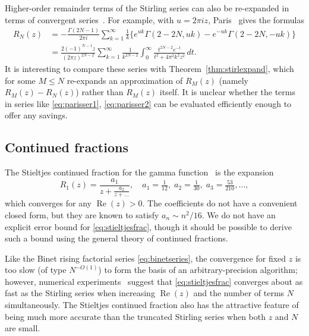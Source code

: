 \documentclass[reqno]{amsart}
\newcommand{\Real}{\operatorname{Re}}
\theoremstyle{definition}
\begin{document}
Higher-order remainder terms of the Stirling series can also
be re-expanded in terms of convergent series~\cite{Paris1992,paris2014comments,Nemes2015}.
For example, with $u = 2\pi i z$, Paris~\cite{paris2014comments} gives the formulas
\begin{align}
R_N(z) & =-\frac{\Gamma(2N-1)}{2\pi i} \sum_{k=1}^\infty \frac{1}{k}\{e^{uk} \Gamma(2-2N,uk)-e^{-uk} \Gamma(2-2N,-uk)\}  \label{eq:parisser1} \\
       &=\frac{2(-1)^{N-1}z}{(2\pi z)^{2N-2}}\sum_{k=1}^\infty\frac{1}{k^{2N-2}}\int_0^{\infty} \!\!\frac{t^{2N-2}e^{-t}}{t^2+4\pi^2k^2z^2}\,dt. \label{eq:parisser2}
\end{align}
It is interesting to compare these series with
Theorem~\eqref{thm:stirlexpand}, which for some $M \le N$ re-expands an approximation of $R_M(z)$ (namely $R_M(z) - R_N(z)$)
rather than $R_M(z)$ itself.
It is unclear whether the terms in
series like \eqref{eq:parisser1}, \eqref{eq:parisser2} can be evaluated efficiently enough to
offer any savings.

\subsection{Continued fractions}

The Stieltjes continued fraction for the gamma function~\cite{Char1980,cuyt2008handbook}
is the expansion
\begin{equation}
R_1(z) = \frac{a_1}{z + \displaystyle{\frac{a_2}{z + \ldots}}}, \quad a_1 = \tfrac{1}{12}, \; a_2 = \tfrac{1}{30}, \; a_3 = \tfrac{53}{210}, \ldots,
\label{eq:stieltjesfrac}
\end{equation}
which converges for any $\Real(z) > 0$.
The coefficients do not have a convenient closed form, but they are known to satisfy $a_n \sim n^2 / 16$.
We do not have an explicit error bound for \eqref{eq:stieltjesfrac}, though
it should be possible to derive such a bound using the general theory of continued fractions.

Like the Binet rising factorial series \eqref{eq:binetseries}, the convergence for fixed $z$ is too slow (of type $N^{-O(1)}$)
to form the basis of an arbitrary-precision algorithm; however, numerical experiments~\cite[Section 12.2]{cuyt2008handbook} suggest
that \eqref{eq:stieltjesfrac} converges about as fast as the Stirling series when increasing $\Real(z)$ and the number of terms $N$
simultaneously. The Stieltjes continued fraction also has the attractive feature of being much
more accurate than the truncated Stirling series when both $z$ and $N$ are small.
\end{document}
